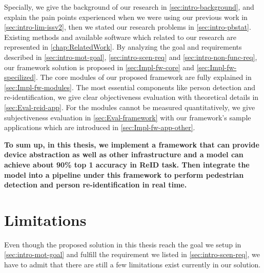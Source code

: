 Specially, we give the background of our research in
\autoref{sec:intro-background}, and explain the pain points experienced when we
were using our previous work in \autoref{sec:intro-lim-issv2}, then we stated our
research problems in \autoref{sec:intro-pbstat}. Existing methods
and available software which related to our research are represented in
\autoref{chap:RelatedWork}. By analyzing the goal and requirements described in
\autoref{sec:intro-mot-goal}, \autoref{sec:intro-scen-req} and
\autoref{sec:intro-non-func-req}, our framework solution is proposed in
\autoref{sec:Impl-fw-core} and \autoref{sec:Impl-fw-specilized}. The core modules of
our proposed framework are fully explained in \autoref{sec:Impl-fw-modules}.
The most essential components like person detection and re-identification, we
give clear objectiveness evaluation with theoretical details in
\autoref{sec:Eval-reid-app}. For the modules cannot be measured quantitatively, we
give subjectiveness evaluation in \autoref{sec:Eval-framework} with our framework's
sample applications which are introduced in \autoref{sec:Impl-fw-app-other}.

\textbf{To sum up, in this thesis, we implement a framework that can provide
device abstraction as well as other infrastructure and a model can achieve
about 90\% top 1 accuracy in ReID task. Then integrate the model into a
pipeline under this framework to perform pedestrian detection and person
re-identification in real time.}

\section{Limitations}
\label{sec:Conclusion-limitation}

Even though the proposed solution in this thesis reach the goal we setup in
\autoref{sec:intro-mot-goal} and fulfill the requirement we listed in
\autoref{sec:intro-scen-req}, we have to admit that there are still a few
limitations exist currently in our solution.


